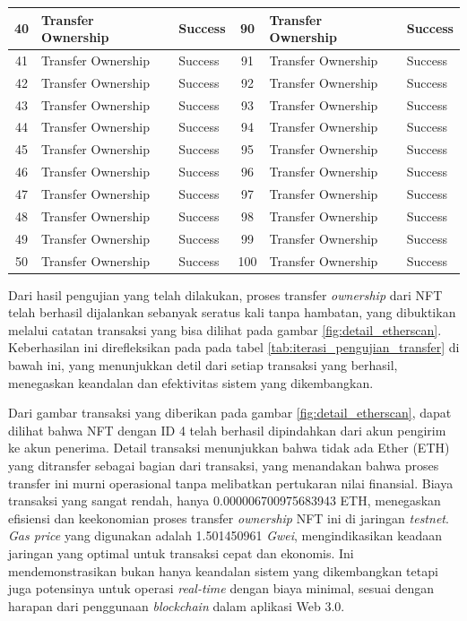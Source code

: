\begin{longtable}[c]{|c|l|l||c|l|l|}
  40 & Transfer Ownership & Success & 90 & Transfer Ownership & Success \\ \hline
  41 & Transfer Ownership & Success & 91 & Transfer Ownership & Success \\ \hline
  42 & Transfer Ownership & Success & 92 & Transfer Ownership & Success \\ \hline
  43 & Transfer Ownership & Success & 93 & Transfer Ownership & Success \\ \hline
  44 & Transfer Ownership & Success & 94 & Transfer Ownership & Success \\ \hline
  45 & Transfer Ownership & Success & 95 & Transfer Ownership & Success \\ \hline
  46 & Transfer Ownership & Success & 96 & Transfer Ownership & Success \\ \hline
  47 & Transfer Ownership & Success & 97 & Transfer Ownership & Success \\ \hline
  48 & Transfer Ownership & Success & 98 & Transfer Ownership & Success \\ \hline
  49 & Transfer Ownership & Success & 99 & Transfer Ownership & Success \\ \hline
  50 & Transfer Ownership & Success & 100 & Transfer Ownership & Success \\ \hline
  \end{longtable}  

Dari hasil pengujian yang telah dilakukan, proses transfer \emph{ownership} dari NFT telah berhasil dijalankan
sebanyak seratus kali tanpa hambatan, yang dibuktikan melalui catatan transaksi yang bisa dilihat pada gambar \ref{fig:detail_etherscan}. Keberhasilan
ini direfleksikan pada pada tabel \ref{tab:iterasi_pengujian_transfer} di bawah ini, yang menunjukkan detil dari setiap
transaksi yang berhasil, menegaskan keandalan dan efektivitas sistem yang dikembangkan. 

Dari gambar transaksi yang diberikan pada gambar \ref*{fig:detail_etherscan}, dapat dilihat bahwa NFT dengan ID 4 telah berhasil dipindahkan dari akun pengirim ke akun penerima. Detail transaksi menunjukkan bahwa tidak ada Ether (ETH) yang ditransfer sebagai bagian dari transaksi, yang menandakan bahwa proses transfer ini murni operasional tanpa melibatkan pertukaran nilai finansial. Biaya transaksi yang sangat rendah, hanya 0.000006700975683943 ETH, menegaskan efisiensi dan keekonomian proses transfer \emph{ownership} NFT ini di jaringan \emph{testnet}. \emph{Gas price} yang digunakan adalah 1.501450961 \emph{Gwei}, mengindikasikan keadaan jaringan yang optimal untuk transaksi cepat dan ekonomis. Ini mendemonstrasikan bukan hanya keandalan sistem yang dikembangkan tetapi juga potensinya untuk operasi \emph{real-time} dengan biaya minimal, sesuai dengan harapan dari penggunaan \emph{blockchain} dalam aplikasi Web 3.0.